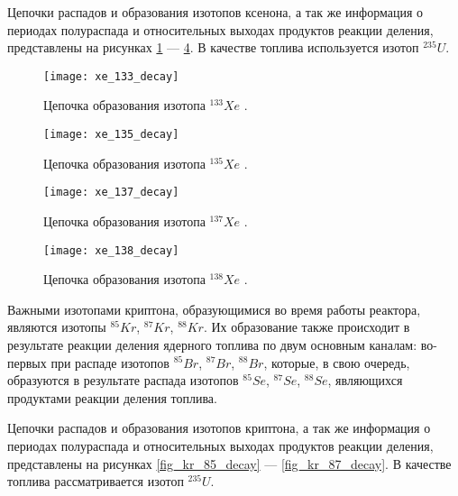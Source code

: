 Цепочки распадов и образования изотопов ксенона, а так же информация о периодах полураспада и относительных выходах 
продуктов реакции деления, представлены на рисунках \ref{fig_xe_133_decay} --- \ref{fig_xe_138_decay}. В качестве топлива 
используется изотоп $^{235}U$.

\begin{figure}[ht!]
    \centering
    \texttt{[image: xe\_133\_decay]}
    \captionsetup{justification=centering}
    \caption{Цепочка образования изотопа $^{133}Xe$ \cite{periodic_table}.}
    \label{fig_xe_133_decay}
\end{figure}

\begin{figure}[ht!]
    \centering
    \texttt{[image: xe\_135\_decay]}
    \captionsetup{justification=centering}
    \caption{Цепочка образования изотопа $^{135}Xe$ \cite{periodic_table}.}
    \label{fig_xe_135_decay}
\end{figure}

\begin{figure}[ht!]
    \centering
    \texttt{[image: xe\_137\_decay]}
    \captionsetup{justification=centering}
    \caption{Цепочка образования изотопа $^{137}Xe$ \cite{periodic_table}.}
    \label{fig_xe_137_decay}
\end{figure}

\begin{figure}[ht!]
    \centering
    \texttt{[image: xe\_138\_decay]}
    \captionsetup{justification=centering}
    \caption{Цепочка образования изотопа $^{138}Xe$ \cite{periodic_table}.}
    \label{fig_xe_138_decay}
\end{figure}

Важными изотопами криптона, образующимися во время работы реактора, являются изотопы $^{85}Kr$, $^{87}Kr$, $^{88}Kr$. Их 
образование также происходит в результате реакции деления ядерного топлива по двум основным каналам: во-первых при распаде 
изотопов $^{85}Br$, $^{87}Br$, $^{88}Br$, которые, в свою очередь, образуются в результате распада изотопов $^{85}Se$, 
$^{87}Se$, $^{88}Se$, являющихся продуктами реакции деления топлива.

Цепочки распадов и образования изотопов криптона, а так же информация о периодах полураспада и относительных выходах 
продуктов реакции деления, представлены на рисунках \ref{fig_kr_85_decay} --- \ref{fig_kr_87_decay}. В качестве топлива 
рассматривается изотоп $^{235}U$.


